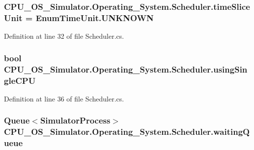 \subsubsection[{time\+Slice\+Unit}]{ C\+P\+U\+\_\+\+O\+S\+\_\+\+Simulator.\+Operating\+\_\+\+System.\+Scheduler.\+time\+Slice\+Unit = {\bf Enum\+Time\+Unit.\+U\+N\+K\+N\+O\+W\+N}\hspace{0.3cm}{\ttfamily [private]}}\label{class_c_p_u___o_s___simulator_1_1_operating___system_1_1_scheduler_a0622698ea0dc65d42250dae5787846fd}


Definition at line 32 of file Scheduler.\+cs.

\hypertarget{class_c_p_u___o_s___simulator_1_1_operating___system_1_1_scheduler_acd5c163fd74bd9e7ad4cbeb7f55c0338}{}
\subsubsection[{using\+Single\+C\+P\+U}]{\setlength{\rightskip}{0pt plus 5cm}bool C\+P\+U\+\_\+\+O\+S\+\_\+\+Simulator.\+Operating\+\_\+\+System.\+Scheduler.\+using\+Single\+C\+P\+U\hspace{0.3cm}{\ttfamily [private]}}\label{class_c_p_u___o_s___simulator_1_1_operating___system_1_1_scheduler_acd5c163fd74bd9e7ad4cbeb7f55c0338}


Definition at line 36 of file Scheduler.\+cs.

\hypertarget{class_c_p_u___o_s___simulator_1_1_operating___system_1_1_scheduler_abc9ae70e3bbda89777732cafa895bbdf}{}
\subsubsection[{waiting\+Queue}]{\setlength{\rightskip}{0pt plus 5cm}Queue$<${\bf Simulator\+Process}$>$ C\+P\+U\+\_\+\+O\+S\+\_\+\+Simulator.\+Operating\+\_\+\+System.\+Scheduler.\+waiting\+Queue\hspace{0.3cm}{\ttfamily [private]}}\label{class_c_p_u___o_s___simulator_1_1_operating___system_1_1_scheduler_abc9ae70e3bbda89777732cafa895bbdf}


